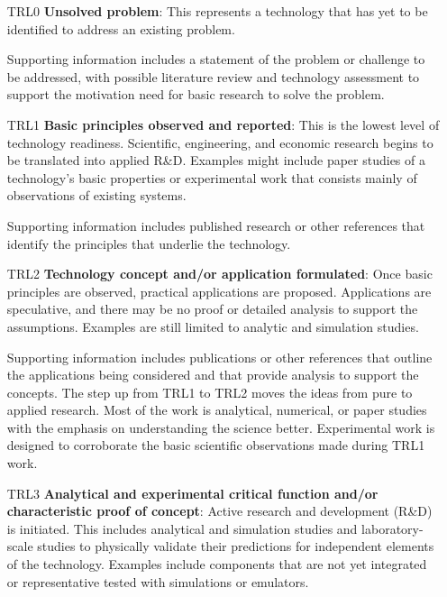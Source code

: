 \begin{enumerate}

    \item[\footnotesize TRL0] \textbf{Unsolved problem}: This represents a technology that has yet to be identified to address an existing problem.
    
    Supporting information includes a statement of the problem or challenge to be addressed, with possible literature review and technology assessment to support the motivation need for basic research to solve the problem.
    
    \item[\footnotesize TRL1] \textbf{Basic principles observed and reported}: This is the lowest level of technology readiness. Scientific, engineering, and economic research begins to be translated into applied R\&D. Examples might include paper studies of a technology's basic properties or experimental work that consists mainly of observations of existing systems. 
    
    Supporting information includes published research or other references that identify the principles that underlie the technology.

    \item[\footnotesize TRL2] \textbf{Technology concept and/or application formulated}: Once basic principles are observed, practical applications are proposed. Applications are speculative, and there may be no proof or detailed analysis to support the assumptions. Examples are still limited to analytic and simulation studies. 
    
    Supporting information includes publications or other references that outline the applications being considered and that provide analysis to support the concepts. The step up from TRL1 to TRL2 moves the ideas from pure to applied research. Most of the work is analytical, numerical, or paper studies with the emphasis on understanding the science better. Experimental work is designed to corroborate the basic scientific observations made during TRL1 work.
    
    \item[\footnotesize TRL3] \textbf{Analytical and experimental critical function and/or characteristic proof of concept}: Active research and development (R\&D) is initiated. This includes analytical and simulation studies and laboratory-scale studies to physically validate their predictions for independent elements of the technology. Examples include components that are not yet integrated or representative tested with simulations or emulators. 
    

\end{enumerate}
